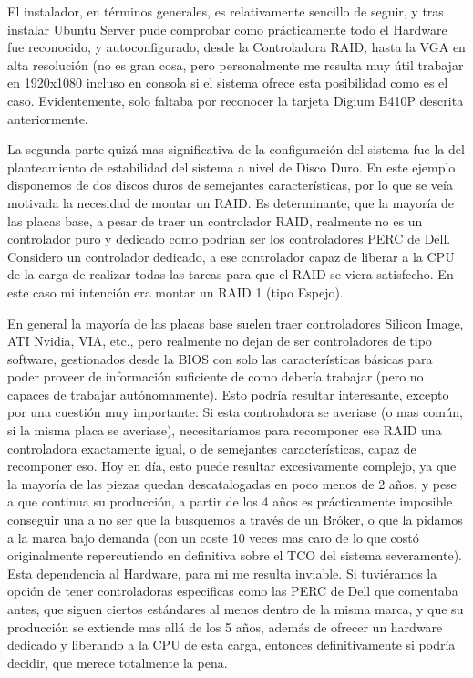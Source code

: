 El instalador, en términos generales, es relativamente sencillo de seguir, y tras instalar Ubuntu Server pude comprobar como prácticamente todo el Hardware fue reconocido, y autoconfigurado, desde la Controladora RAID, hasta la VGA en alta resolución (no es gran cosa, pero personalmente me resulta muy útil trabajar en 1920x1080 incluso en consola si el sistema ofrece esta posibilidad como es el caso. Evidentemente, solo faltaba por reconocer la tarjeta Digium B410P descrita anteriormente.

La segunda parte quizá mas significativa de la configuración del sistema fue la del planteamiento de estabilidad del sistema a nivel de Disco Duro. En este ejemplo disponemos de dos discos duros de semejantes características, por lo que se veía motivada la necesidad de montar un RAID. Es determinante, que la mayoría de las placas base, a pesar de traer un controlador RAID, realmente no es un controlador puro y dedicado como podrían ser los controladores PERC de Dell. Considero un controlador dedicado, a ese controlador capaz de liberar a la CPU de la carga de realizar todas las tareas para que el RAID se viera satisfecho. En este caso mi intención era montar un RAID 1 (tipo Espejo).

En general la mayoría de las placas base suelen traer controladores Silicon Image, ATI Nvidia, VIA, etc., pero realmente no dejan de ser controladores de tipo software, gestionados desde la BIOS con solo las características básicas para poder proveer de información suficiente de como debería trabajar (pero no capaces de trabajar autónomamente). Esto podría resultar interesante, excepto por una cuestión muy importante: Si esta controladora se averiase (o mas común, si la misma placa se averiase), necesitaríamos para recomponer ese RAID una controladora exactamente igual, o de semejantes características, capaz de recomponer eso. Hoy en día, esto puede resultar excesivamente complejo, ya que la mayoría de las piezas quedan descatalogadas en poco menos de 2 años, y pese a que continua su producción, a partir de los 4 años es prácticamente imposible conseguir una a no ser que la busquemos a través de un Bróker, o que la pidamos a la marca bajo demanda (con un coste 10 veces mas caro de lo que costó originalmente repercutiendo en definitiva sobre el TCO del sistema severamente). Esta dependencia al Hardware, para mi me resulta inviable. Si tuviéramos la opción de tener controladoras especificas como las PERC de Dell que comentaba antes, que siguen ciertos estándares al menos dentro de la misma marca, y que su producción se extiende mas allá de los 5 años, además de ofrecer un hardware dedicado y liberando a la CPU de esta carga, entonces definitivamente si podría decidir, que merece totalmente la pena.

